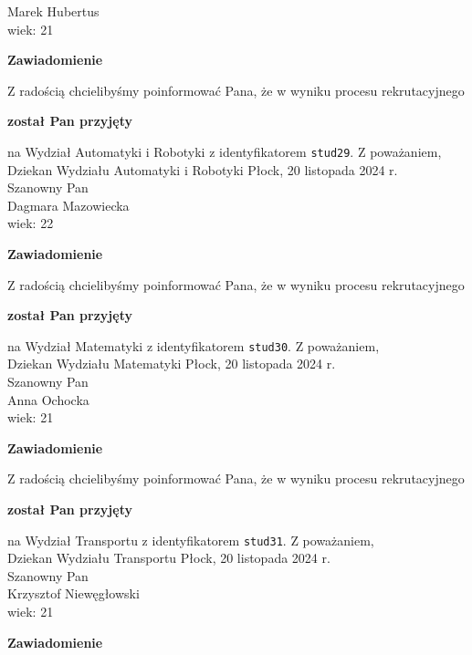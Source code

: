 \documentclass[12pt,a4paper]{article}
\begin{document}
Marek Hubertus \\
wiek: 21
\bigskip
\begin{center}
 	{\Large\textbf{Zawiadomienie}}
\end{center}
\bigskip
Z radością chcielibyśmy poinformować Pana, że w wyniku procesu rekrutacyjnego 
\begin{center}
\textsf{\textbf{został Pan przyjęty}} 
\end{center}
na Wydział Automatyki i Robotyki z identyfikatorem \verb|stud29|. 
\vspace{2cm}
\noindent
Z poważaniem,\\
Dziekan
Wydziału Automatyki i Robotyki
\newpage
\hfill Płock, 20 listopada 2024 r.\\
\noindent 
Szanowny Pan \\
Dagmara Mazowiecka \\
wiek: 22
\bigskip
\begin{center}
 	{\Large\textbf{Zawiadomienie}}
\end{center}
\bigskip
Z radością chcielibyśmy poinformować Pana, że w wyniku procesu rekrutacyjnego 
\begin{center}
\textsf{\textbf{został Pan przyjęty}} 
\end{center}
na Wydział Matematyki z identyfikatorem \verb|stud30|. 
\vspace{2cm}
\noindent
Z poważaniem,\\
Dziekan
Wydziału Matematyki
\newpage
\hfill Płock, 20 listopada 2024 r.\\
\noindent 
Szanowny Pan \\
Anna Ochocka \\
wiek: 21
\bigskip
\begin{center}
 	{\Large\textbf{Zawiadomienie}}
\end{center}
\bigskip
Z radością chcielibyśmy poinformować Pana, że w wyniku procesu rekrutacyjnego 
\begin{center}
\textsf{\textbf{został Pan przyjęty}} 
\end{center}
na Wydział Transportu z identyfikatorem \verb|stud31|. 
\vspace{2cm}
\noindent
Z poważaniem,\\
Dziekan
Wydziału Transportu
\newpage
\hfill Płock, 20 listopada 2024 r.\\
\noindent 
Szanowny Pan \\
Krzysztof Niewęgłowski \\
wiek: 21
\bigskip
\begin{center}
 	{\Large\textbf{Zawiadomienie}}
\end{center}
\end{document}
